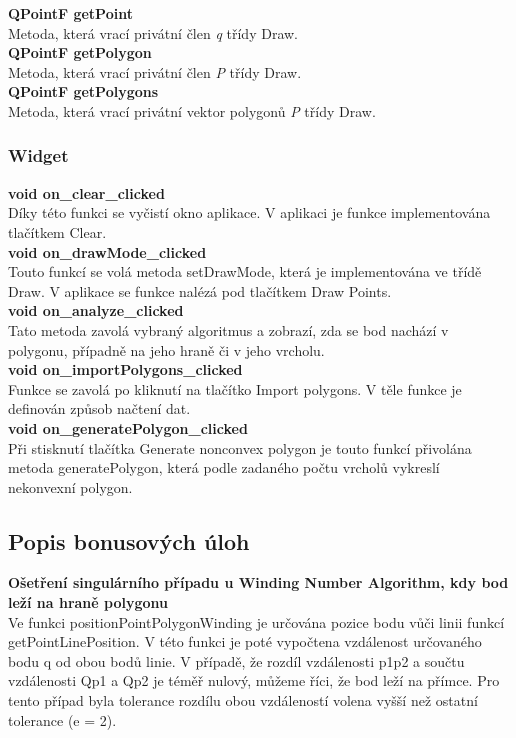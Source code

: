 \documentclass[a4paper,11pt,twoside]{article}
\begin{document}
\noindent\textbf{QPointF getPoint}\\
Metoda, která vrací privátní člen \textit{q} třídy Draw.\\

\noindent\textbf{QPointF getPolygon}\\
Metoda, která vrací privátní člen \textit{P} třídy Draw.\\

\noindent\textbf{QPointF getPolygons}\\
Metoda, která vrací privátní vektor polygonů \textit{P} třídy Draw.

\subsubsection{Widget}
\noindent\textbf{void on\_clear\_clicked}\\
Díky této funkci se vyčistí okno aplikace.  V aplikaci je funkce implementována tlačítkem Clear.\\

\noindent\textbf{void on\_drawMode\_clicked}\\
Touto funkcí se volá metoda setDrawMode, která je implementována ve třídě Draw. V aplikace se funkce nalézá pod tlačítkem Draw Points. \\

\noindent\textbf{void on\_analyze\_clicked}\\
Tato metoda zavolá vybraný algoritmus a zobrazí, zda se bod nachází v polygonu, případně na jeho hraně či v jeho vrcholu.\\

\noindent\textbf{void on\_importPolygons\_clicked}\\
Funkce se zavolá po kliknutí na tlačítko Import polygons. V těle funkce je definován způsob načtení dat.\\

\noindent\textbf{void on\_generatePolygon\_clicked}\\
Při stisknutí tlačítka Generate nonconvex polygon je touto funkcí přivolána metoda generatePolygon, která podle zadaného počtu vrcholů vykreslí nekonvexní polygon.

\newpage
\vspace*{-1cm}
\subsection{Popis bonusových úloh}
\noindent\textbf{Ošetření singulárního případu u Winding Number Algorithm, kdy bod leží na hraně polygonu}\\
Ve funkci positionPointPolygonWinding je určována pozice bodu vůči linii funkcí getPointLinePosition. V této funkci je poté vypočtena vzdálenost určovaného bodu q od obou bodů linie. V případě, že rozdíl vzdálenosti p1p2 a součtu vzdálenosti Qp1 a Qp2 je téměř nulový, můžeme říci, že bod leží na přímce.  Pro tento případ byla tolerance rozdílu obou vzdáleností volena vyšší než ostatní tolerance (e = 2).\\
\end{document}
